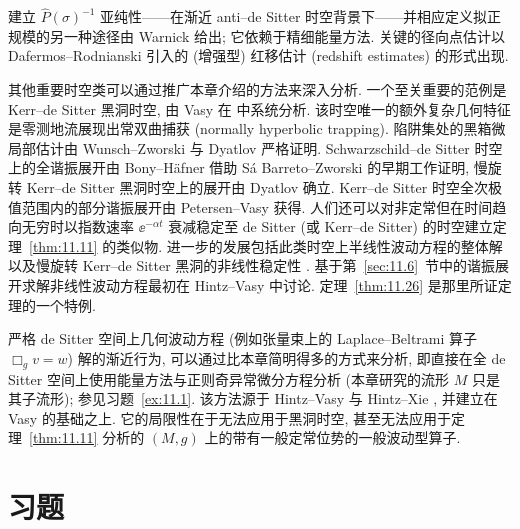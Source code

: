 建立 $\widehat{P}(\sigma)^{-1}$ 亚纯性——在渐近 anti--de Sitter 时空背景下——并相应定义拟正规模的另一种途径由 Warnick \cite{War15} 给出; 它依赖于精细能量方法. 关键的径向点估计以 Dafermos--Rodnianski \cite{DR09} 引入的 (增强型) 红移估计 (redshift estimates) 的形式出现.

其他重要时空类可以通过推广本章介绍的方法来深入分析. 一个至关重要的范例是 Kerr--de Sitter 黑洞时空, 由 Vasy 在 \cite[§6]{Vas13} 中系统分析. 该时空唯一的额外复杂几何特征是零测地流展现出常双曲捕获 (normally hyperbolic trapping). 陷阱集处的黑箱微局部估计由 Wunsch--Zworski \cite{WZ11} 与 Dyatlov \cite{Dya16} 严格证明. Schwarzschild--de Sitter 时空上的全谐振展开由 Bony--Häfner \cite{BH08} 借助 Sá Barreto--Zworski \cite{SBZ97} 的早期工作证明, 慢旋转 Kerr--de Sitter 黑洞时空上的展开由 Dyatlov \cite{Dya12} 确立. Kerr--de Sitter 时空全次极值范围内的部分谐振展开由 Petersen--Vasy \cite{PV21} 获得. 人们还可以对非定常但在时间趋向无穷时以指数速率 $\ee^{-\alpha t}$ 衰减稳定至 de Sitter (或 Kerr--de Sitter) 的时空建立定理~\ref{thm:11.11} 的类似物. 进一步的发展包括此类时空上半线性波动方程的整体解 \cite{HV15, HV16} 以及慢旋转 Kerr--de Sitter 黑洞的非线性稳定性 \cite{HV18}. 基于第~\ref{sec:11.6}~节中的谐振展开求解非线性波动方程最初在 Hintz--Vasy \cite{HV15} 中讨论. 定理~\ref{thm:11.26} 是那里所证定理的一个特例.

严格 de Sitter 空间上几何波动方程 (例如张量束上的 Laplace--Beltrami 算子 $\Box_g v = w$) 解的渐近行为, 可以通过比本章简明得多的方式来分析, 即直接在全 de Sitter 空间上使用能量方法与正则奇异常微分方程分析 (本章研究的流形 $M$ 只是其子流形); 参见习题~\ref{ex:11.1}. 该方法源于 Hintz--Vasy \cite[附录 C]{HV18} 与 Hintz--Xie \cite{HX21, HX22}, 并建立在 Vasy \cite{Vas10} 的基础之上. 它的局限性在于无法应用于黑洞时空, 甚至无法应用于定理~\ref{thm:11.11} 分析的 $(M, g)$ 上的带有一般定常位势的一般波动型算子.

\section*{习题}

